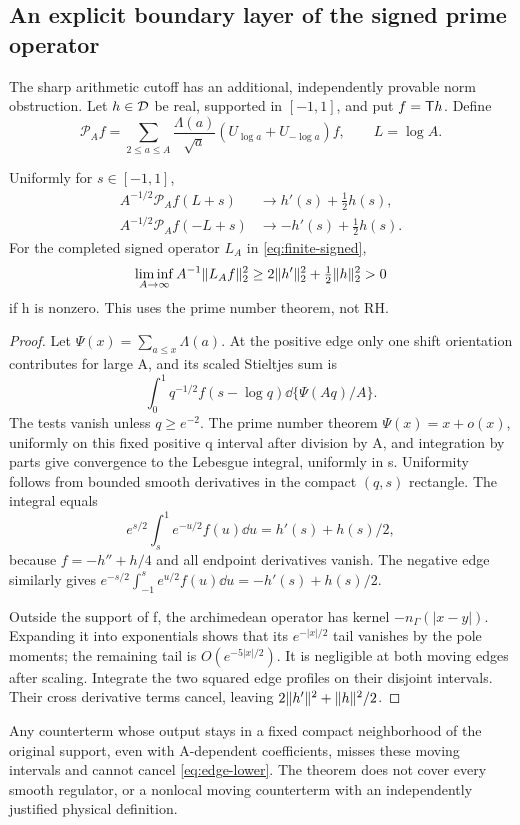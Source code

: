 \subsection{An explicit boundary layer of the signed prime operator}
The sharp arithmetic cutoff has an additional, independently
provable norm obstruction. Let $h\in\mathcal D$ be real, supported
in $[-1,1]$, and put $f=\mathsf T h$. Define
\begin{equation}
\mathcal P_A f=\sum_{2\le a\le A}\frac{\Lambda(a)}{\sqrt a}
(U_{\log a}+U_{-\log a})f,\qquad L=\log A .
\end{equation}

\begin{theorem}\label{thm:edges}
Uniformly for $s\in[-1,1]$,
\begin{align}
A^{-1/2}\mathcal P_A f(L+s)&\longrightarrow h'(s)+\tfrac12h(s),\\
A^{-1/2}\mathcal P_A f(-L+s)&\longrightarrow-h'(s)+\tfrac12h(s).
\end{align}
For the completed signed operator $L_A$ in
\eqref{eq:finite-signed},
\begin{equation}\label{eq:edge-lower}
\liminf_{A\to\infty}A^{-1}\lVert L_Af\rVert_2^2
\ge2\lVert h'\rVert_2^2+\tfrac12\lVert h\rVert_2^2>0
\end{equation}
if h is nonzero. This uses the prime number theorem, not RH.
\end{theorem}
\begin{proof}
Let $\Psi(x)=\sum_{a\le x}\Lambda(a)$. At the positive edge
only one shift orientation contributes for large A, and its
scaled Stieltjes sum is
\[
\int_0^1 q^{-1/2} f(s-\log q)\dd\{\Psi(Aq)/A\}.
\]
The tests vanish unless $q\ge e^{-2}$. The prime number
theorem $\Psi(x)=x+o(x)$, uniformly on this fixed positive
q interval after division by A, and integration by parts
give convergence to the Lebesgue integral, uniformly in s.
Uniformity follows from bounded smooth derivatives in the
compact $(q,s)$ rectangle. The integral equals
\[
e^{s/2}\int_s^1e^{-u/2}f(u)\dd u=h'(s)+h(s)/2,
\]
because $f=-h''+h/4$ and all endpoint derivatives vanish.
The negative edge similarly gives
$e^{-s/2}\int_{-1}^se^{u/2}f(u)\dd u=-h'(s)+h(s)/2$.

Outside the support of f, the archimedean operator has kernel
$-n_\Gamma(|x-y|)$. Expanding it into exponentials shows that
its $e^{-|x|/2}$ tail vanishes by the pole moments; the
remaining tail is $O(e^{-5|x|/2})$.
It is negligible at both moving edges after scaling.
Integrate the two squared edge profiles on their disjoint
intervals. Their cross derivative terms cancel, leaving
$2\lVert h'\rVert^2+\lVert h\rVert^2/2$.
\end{proof}
Any counterterm whose output stays in a fixed compact
neighborhood of the original support, even with A-dependent
coefficients, misses these moving intervals and cannot cancel
\eqref{eq:edge-lower}. The theorem does not cover every smooth
regulator, or a nonlocal moving counterterm with an independently
justified physical definition.

